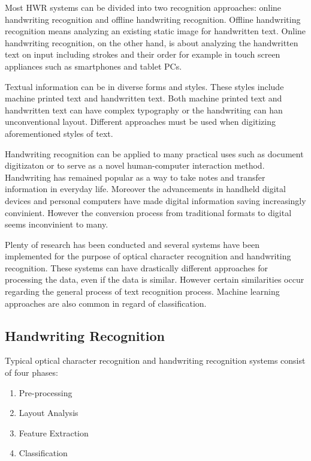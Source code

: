 \documentclass{article}
\begin{document}
    Most HWR systems can be divided into two recognition approaches: online handwriting recognition and offline handwriting recognition. Offline handwriting recognition means analyzing an existing static image for handwritten text. Online handwriting recognition, on the other hand, is about analyzing the handwritten text on input including strokes and their order for example in touch screen appliances such as smartphones and tablet PCs.

    Textual information can be in diverse forms and styles. These styles include machine printed text and handwritten text. Both machine printed text and handwritten text can have complex typography or the handwriting can han unconventional layout. Different approaches must be used when digitizing aforementioned styles of text.

    Handwriting recognition can be applied to many practical uses such as document digitizaton or to serve as a novel human-computer interaction method. Handwriting has remained popular as a way to take notes and transfer information in everyday life. Moreover the advancements in handheld digital devices and personal computers have made digital information saving increasingly convinient. However the conversion process from traditional formats to digital seems inconvinient to many.

    Plenty of research has been conducted and several systems have been implemented for the purpose of optical character recognition and handwriting recognition. These systems can have drastically different approaches for processing the data, even if the data is similar. However certain similarities occur regarding the general process of text recognition process. Machine learning approaches are also common in regard of classification.


  \subsection{Handwriting Recognition}
    Typical optical character recognition and handwriting recognition systems consist of four phases:

    \begin{enumerate}
      \item{Pre-processing}
      \item{Layout Analysis}
      \item{Feature Extraction}
      \item{Classification}
    \end{enumerate}
\end{document}
